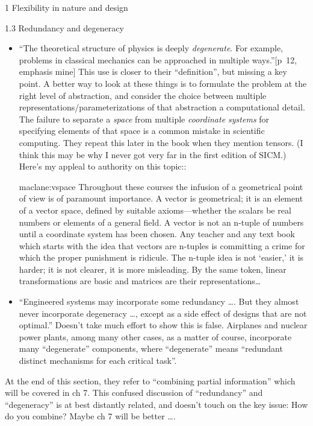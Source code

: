 \documentclass[12pt]{PalisadesLakesBook}
\begin{document}
\begin{plSection}{}
\begin{plSection}{1 Flexibility in nature and design}
\begin{plSection}{1.3 Redundancy and degeneracy}
\begin{itemize}
  \item ``The theoretical structure of physics is deeply 
\emph{degenerate}.
For example, problems in classical mechanics can be approached
in multiple ways.''[p~12, emphasis mine]
This use is closer to their ``definition'',
but missing a key point. 
A better way to look at these things is to formulate 
the problem at the right level of abstraction,
and consider the choice between 
multiple representations/parameterizations of that abstraction
a computational detail.
The failure to separate a \emph{space} 
from multiple \emph{coordinate systems} for specifying
elements of that space is a common mistake 
in scientific computing.
They repeat this later in the book when they mention tensors.
(I think this may be why I never got very far 
in the first edition of SICM.)
Here's my appleal to authority on this topic::
\begin{plQuote}
{}
{maclane:vspace}
Throughout these courses the infusion of a geometrical
point of view is of paramount importance. A vector
is geometrical; it is an element of a vector space, defined
by suitable axioms—whether the scalars be real numbers or
elements of a general field. A vector is not an n-tuple of
numbers until a coordinate system has been chosen. Any
teacher and any text book which starts with the idea that vectors
are n-tuples is committing a crime for which the proper
punishment is ridicule. The n-tuple idea is not ‘easier,’ it is
harder; it is not clearer, it is more misleading. By the same
token, linear transformations are basic and matrices are their
representations\ldots
\end{plQuote}

\item ``Engineered systems may incorporate some redundancy 
{\ldots}.
But they almost never incorporate degeneracy {\ldots},
except as a side effect of designs that are not optimal.''
Doesn't take much effort to show this is false.
Airplanes and nuclear power plants, among many other cases,
as a matter of course, incorporate many ``degenerate'' components,
where ``degenerate'' means 
``redundant distinct mechanisms for each critical task''.

\end{itemize}

At the end of this section, they refer to 
``combining partial information'' which will be covered in ch 7.
This confused discussion of ``redundancy'' and ``degeneracy''
is at best distantly related, and doesn't touch 
on the key issue: How do you combine?
Maybe ch 7 will be better {\ldots}.


\end{plSection}
\end{plSection}
\end{plSection}
\end{document}
